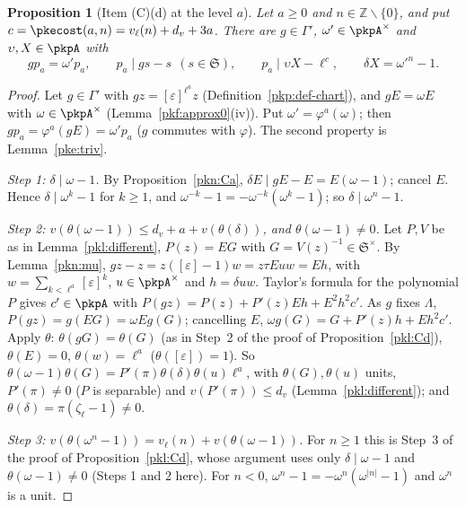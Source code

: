 \documentclass[10pt]{amsart}
\newtheorem{proposition}[theorem]{Proposition}
\theoremstyle{definition}
\theoremstyle{remark}
\newcommand{\Z}{\mathbb Z}
\begin{document}
\begin{proposition}[Item (C)(d) at the level $a$]\label{pke:Cd}
Let $a\ge0$ and $n\in\Z\smallsetminus\{0\}$, and put $c=\pkecost(a,n)=v_\ell(n)+d_v+3a$. There are $g\in
\Gamma'$, $\omega'\in\pkpA^\times$ and $\upsilon,X\in\pkpA$ with
\[
gp_a=\omega'p_a,\qquad p_a\mid gs-s\ \ (s\in\mathfrak S),\qquad p_a\mid\upsilon X-\ell^c,\qquad
\delta X=\omega'^n-1 .
\]
\end{proposition}

\begin{proof}
Let $g\in\Gamma'$ with $gz=[\varepsilon]^{\ell^a}z$ (Definition~\ref{pkp:def-chart}), and $gE=\omega E$ with
$\omega\in\pkpA^\times$ (Lemma~\ref{pkf:approx0}(iv)). Put $\omega'=\varphi^a(\omega)$; then $gp_a=
\varphi^a(gE)=\omega'p_a$ ($g$ commutes with $\varphi$). The second property is Lemma~\ref{pke:triv}.

\emph{Step 1: $\delta\mid\omega-1$.} By Proposition~\ref{pkn:Ca}, $\delta E\mid gE-E=E(\omega-1)$; cancel $E$.
Hence $\delta\mid\omega^k-1$ for $k\ge1$, and $\omega^{-k}-1=-\omega^{-k}(\omega^k-1)$; so $\delta\mid
\omega^n-1$.

\emph{Step 2: $v(\theta(\omega-1))\le d_v+a+v(\theta(\delta))$, and $\theta(\omega-1)\ne0$.} Let $P,V$ be as in
Lemma~\ref{pkl:different}, $P(z)=EG$ with $G=V(z)^{-1}\in\mathfrak S^\times$. By Lemma~\ref{pkn:mu},
$gz-z=z([\varepsilon]-1)w=z\tau Euw=Eh$, with $w=\sum_{k<\ell^a}[\varepsilon]^k$, $u\in\pkpA^\times$ and $h=
\delta uw$. Taylor's formula for the polynomial $P$ gives $c'\in\pkpA$ with $P(gz)=P(z)+P'(z)Eh+E^2h^2c'$. As $g$
fixes $\Lambda$, $P(gz)=g(EG)=\omega Eg(G)$; cancelling $E$, $\omega g(G)=G+P'(z)h+Eh^2c'$. Apply $\theta$:
$\theta(gG)=\theta(G)$ (as in Step~2 of the proof of Proposition~\ref{pkl:Cd}), $\theta(E)=0$, $\theta(w)=\ell^a$
($\theta([\varepsilon])=1$). So $\theta(\omega-1)\theta(G)=P'(\pi)\theta(\delta)\theta(u)\ell^a$, with
$\theta(G),\theta(u)$ units, $P'(\pi)\ne0$ ($P$ is separable) and $v(P'(\pi))\le d_v$
(Lemma~\ref{pkl:different}); and $\theta(\delta)=\pi(\zeta_\ell-1)\ne0$.

\emph{Step 3: $v(\theta(\omega^n-1))=v_\ell(n)+v(\theta(\omega-1))$.} For $n\ge1$ this is Step~3 of the proof
of Proposition~\ref{pkl:Cd}, whose argument uses only $\delta\mid\omega-1$ and $\theta(\omega-1)\ne0$ (Steps 1
and 2 here). For $n<0$, $\omega^n-1=-\omega^n(\omega^{|n|}-1)$ and $\omega^n$ is a unit.


\end{proof}
\end{document}

